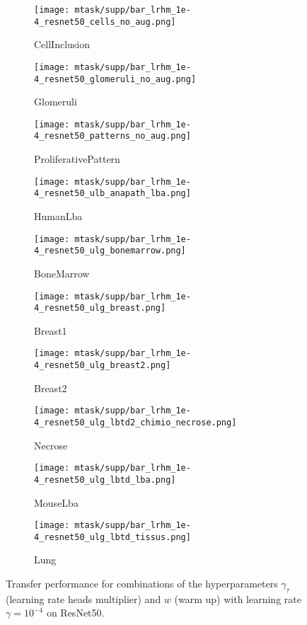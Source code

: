 \begin{figure*}[h]
  \centering
  \begin{subfigure}{0.48\textwidth}
    \centering
    \texttt{[image: mtask/supp/bar\_lrhm\_1e-4\_resnet50\_cells\_no\_aug.png]}
    \caption{CellInclusion}
  \end{subfigure}
  \begin{subfigure}{0.48\textwidth}
    \centering
    \texttt{[image: mtask/supp/bar\_lrhm\_1e-4\_resnet50\_glomeruli\_no\_aug.png]}\\
    \caption{Glomeruli}
  \end{subfigure}
  \begin{subfigure}{0.48\textwidth}
    \centering
    \texttt{[image: mtask/supp/bar\_lrhm\_1e-4\_resnet50\_patterns\_no\_aug.png]}
    \caption{ProliferativePattern}
  \end{subfigure}
  \begin{subfigure}{0.48\textwidth}
    \centering
    \texttt{[image: mtask/supp/bar\_lrhm\_1e-4\_resnet50\_ulb\_anapath\_lba.png]}\\
    \caption{HumanLba}
  \end{subfigure}
  \begin{subfigure}{0.48\textwidth}
    \centering
    \texttt{[image: mtask/supp/bar\_lrhm\_1e-4\_resnet50\_ulg\_bonemarrow.png]}
    \caption{BoneMarrow}
  \end{subfigure}
  \begin{subfigure}{0.48\textwidth}
    \centering
    \texttt{[image: mtask/supp/bar\_lrhm\_1e-4\_resnet50\_ulg\_breast.png]}\\
    \caption{Breast1}
  \end{subfigure}
  \begin{subfigure}{0.48\textwidth}
    \centering
    \texttt{[image: mtask/supp/bar\_lrhm\_1e-4\_resnet50\_ulg\_breast2.png]}
    \caption{Breast2}
  \end{subfigure}
  \begin{subfigure}{0.48\textwidth}
    \centering
    \texttt{[image: mtask/supp/bar\_lrhm\_1e-4\_resnet50\_ulg\_lbtd2\_chimio\_necrose.png]}\\
    \caption{Necrose}
  \end{subfigure}
  \begin{subfigure}{0.48\textwidth}
    \centering
    \texttt{[image: mtask/supp/bar\_lrhm\_1e-4\_resnet50\_ulg\_lbtd\_lba.png]}
    \caption{MouseLba}
  \end{subfigure}
  \begin{subfigure}{0.48\textwidth}
    \centering
    \texttt{[image: mtask/supp/bar\_lrhm\_1e-4\_resnet50\_ulg\_lbtd\_tissus.png]}
    \caption{Lung}
  \end{subfigure}
  \caption{Transfer performance for combinations of the hyperparameters $\gamma_\tau$ (learning rate heads multiplier) and $w$ (warm up) with learning rate $\gamma = 10^{-4}$ on ResNet50.}
  \label{app:mtask:fig:bar_lrhm_resnet}
\end{figure*}

